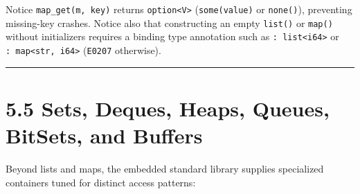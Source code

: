 \documentclass[
  english,
  oneside]{book}
\newcounter{none} %
\begin{document}
Notice \texttt{map\_get(m,\ key)} returns
\texttt{option\textless{}V\textgreater{}} (\texttt{some(value)} or
\texttt{none()}), preventing missing-key crashes. Notice also that
constructing an empty \texttt{list()} or \texttt{map()} without
initializers requires a binding type annotation such as
\texttt{:\ list\textless{}i64\textgreater{}} or
\texttt{:\ map\textless{}str,\ i64\textgreater{}} (\texttt{E0207}
otherwise).

\begin{center}\rule{0.5\linewidth}{0.5pt}\end{center}

\section{5.5 Sets, Deques, Heaps, Queues, BitSets, and
Buffers}\label{sets-deques-heaps-queues-bitsets-and-buffers}

Beyond lists and maps, the embedded standard library supplies
specialized containers tuned for distinct access patterns:
\end{document}
